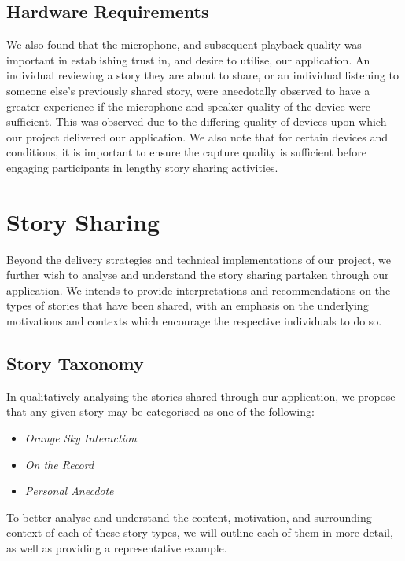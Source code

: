 \subsection{Hardware Requirements}

We also found that the microphone, and subsequent playback quality was important in establishing trust in, and desire to utilise, our application. An individual reviewing a story they are about to share, or an individual listening to someone else's previously shared story, were anecdotally observed to have a greater experience if the microphone and speaker quality of the device were sufficient. This was observed due to the differing quality of devices upon which our project delivered our application. We also note that for certain devices and conditions, it is important to ensure the capture quality is sufficient before engaging participants in lengthy story sharing activities.

\section{Story Sharing}

Beyond the delivery strategies and technical implementations of our project, we further wish to analyse and understand the story sharing partaken through our application. We intends to provide interpretations and recommendations on the types of stories that have been shared, with an emphasis on the underlying motivations and contexts which encourage the respective individuals to do so.

\subsection{Story Taxonomy}

In qualitatively analysing the stories shared through our application, we propose that any given story may be categorised as one of the following:

\begin{itemize}
    \item \emph{Orange Sky Interaction}
    \item \emph{On the Record}
    \item \emph{Personal Anecdote}
\end{itemize}

To better analyse and understand the content, motivation, and surrounding context of each of these story types, we will outline each of them in more detail, as well as providing a representative example.

